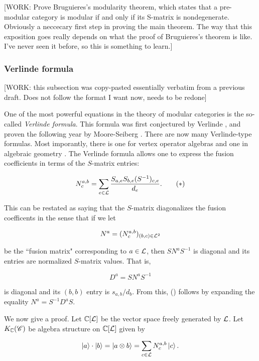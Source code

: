 [WORK: Prove Bruguieres's modularity theorem, which states that a pre-modular category is modular if and only if its S-matrix is nondegenerate. Obviously a neccecary first step in proving the main theorem. The way that this exposition goes really depends on what the proof of Bruguieres's theorem is like. I've never seen it before, so this is something to learn.]


\subsubsection{Verlinde formula}

[WORK: this subsection was copy-pasted essentially verbatim from a previous draft. Does not follow the format I want now, needs to be redone]

One of the most powerful equations in the theory of modular categories is the so-called \textit{Verlinde formula}. This formula was first conjectured by Verlinde \cite{verlinde1988fusion}, and proven the following year by Moore-Seiberg \cite{moore1989classical}. There are now many Verlinde-type formulas. Most imporantly, there is one for vertex operator algebras \cite{huang2008vertex} and one in algebraic geometry \cite{faltings1994proof}. The Verlinde formula allows one to express the fusion coefficients in terms of the $S$-matrix entries:

\begin{equation}
N^{a,b}_{c}=\sum_{e\in \mathcal{L}} \frac{S_{a,e} S_{b,e}(S^{-1})_{c,e}}{d_e}.\tag{\textasteriskcentered}
\end{equation}

This can be restated as saying that the $S$-matrix diagonalizes the fusion coefficents in the sense that if we let

$$N^{a}=(N^{a,b}_c)_{(b,c)\in \mathcal{L}^2}$$

be the ``fusion matrix" corresponding to $a\in \mathcal{L}$, then $SN^aS^{-1}$ is diagonal and its entries are normalized $S$-matrix values. That is,

$$D^a=SN^{a}S^{-1}$$

is diagonal and its $(b,b)$ entry is $s_{a,b}/d_b$. From this, (\textasteriskcentered) follows by expanding the equality $N^{a}=S^{-1} D^{a}S$.

We now give a proof. Let $\mathbb{C}[\mathcal{L}]$ be the vector space freely generated by $\mathcal{L}$. Let $K_{\mathbb{C}}(\mathscr{C})$ be algebra structure on $\mathbb{C}[\mathcal{L}]$ given by

$$\left| a\right>\cdot \left| b\right>=\left| a\otimes b \right>=\sum_{c\in\mathcal{L}}N^{a,b}_c\left| c\right>.$$

